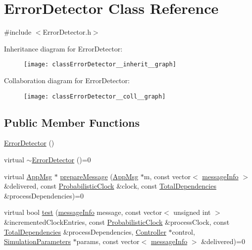 \hypertarget{classErrorDetector}{}\section{Error\+Detector Class Reference}
\label{classErrorDetector}


{\ttfamily \#include $<$Error\+Detector.\+h$>$}



Inheritance diagram for Error\+Detector\+:\nopagebreak
\begin{figure}[H]
\begin{center}
\leavevmode
\texttt{[image: classErrorDetector\_\_inherit\_\_graph]}
\end{center}
\end{figure}


Collaboration diagram for Error\+Detector\+:\nopagebreak
\begin{figure}[H]
\begin{center}
\leavevmode
\texttt{[image: classErrorDetector\_\_coll\_\_graph]}
\end{center}
\end{figure}
\subsection*{Public Member Functions}
\begin{DoxyCompactItemize}
\item 
\hyperlink{classErrorDetector_ae851a02dff242968cd6419400271d74f}{Error\+Detector} ()
\item 
virtual \hyperlink{classErrorDetector_a3708d713f8f7bee01aa7e5a2fb7bb652}{$\sim$\+Error\+Detector} ()=0
\item 
virtual \hyperlink{classAppMsg}{App\+Msg} $\ast$ \hyperlink{classErrorDetector_a8cac1f6ac6803da4379df7891789c490}{prepare\+Message} (\hyperlink{classAppMsg}{App\+Msg} $\ast$m, const vector$<$ \hyperlink{structures_8h_a7e7bdc1d2fff8a9436f2f352b2711ed6}{message\+Info} $>$ \&delivered, const \hyperlink{classProbabilisticClock}{Probabilistic\+Clock} \&clock, const \hyperlink{classTotalDependencies}{Total\+Dependencies} \&process\+Dependencies)=0
\item 
virtual bool \hyperlink{classErrorDetector_afc717d04768dd207196c08e24163115c}{test} (\hyperlink{structures_8h_a7e7bdc1d2fff8a9436f2f352b2711ed6}{message\+Info} message, const vector$<$ unsigned int $>$ \&incremented\+Clock\+Entries, const \hyperlink{classProbabilisticClock}{Probabilistic\+Clock} \&process\+Clock, const \hyperlink{classTotalDependencies}{Total\+Dependencies} \&process\+Dependencies, \hyperlink{classController}{Controller} $\ast$control, \hyperlink{classSimulationParameters}{Simulation\+Parameters} $\ast$params, const vector$<$ \hyperlink{structures_8h_a7e7bdc1d2fff8a9436f2f352b2711ed6}{message\+Info} $>$ \&delivered)=0
\end{DoxyCompactItemize}
